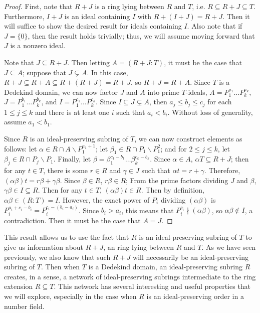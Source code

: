 \documentclass[12pt]{amsart}
\theoremstyle{definition}
\begin{document}
	\begin{proof}
		First, note that $R+J$ is a ring lying between $R$ and $T$, i.e. $R\subseteq R+J\subseteq T$. Furthermore, $I+J$ is an ideal containing $I$ with $R+(I+J)=R+J$. Then it will suffice to show the desired result for ideals containing $I$. Also note that if $J=\{0\}$, then the result holds trivially; thus, we will assume moving forward that $J$ is a nonzero ideal.
		
		Note that $J\subseteq R+J$. Then letting $A=(R+J:T)$, it must be the case that $J\subseteq A$; suppose that $J\subsetneq A$. In this case, $R+J\subseteq R+A\subseteq R+(R+J)=R+J$, so $R+J=R+A$. Since $T$ is a Dedekind domain, we can now factor $J$ and $A$ into prime $T$-ideals, $A=P_1^{a_1}\dots P_k^{a_k}$, $J=P_1^{b_1}\dots P_k^{b_k}$, and $I=P_1^{c_1}\dots P_k^{c_k}$. Since $I\subseteq J\subsetneq A$, then $a_j\leq b_j\leq c_j$ for each $1\leq j\leq k$ and there is at least one $i$ such that $a_i<b_i$. Without loss of generality, assume $a_1<b_1$.
		
		Since $R$ is an ideal-preserving subring of $T$, we can now construct elements as follows: let $\alpha\in R\cap A\backslash P_1^{a_1+1}$; let $\beta_1\in R\cap P_1 \backslash P_1^2$; and for $2\leq j\leq k$, let $\beta_j\in R\cap P_j\backslash P_1$. Finally, let $\beta=\beta_1^{c_1-b_1}\dots\beta_k^{c_k-b_k}$. Since $\alpha\in A$, $\alpha T\subseteq R+J$; then for any $t\in T$, there is some $r\in R$ and $\gamma\in J$ such that $\alpha t=r+\gamma$. Therefore, $(\alpha\beta)t=r\beta+\gamma\beta$. Since $\beta\in R$, $r\beta\in R$; From the prime factors dividing $J$ and $\beta$, $\gamma\beta\in I\subseteq R$. Then for any $t\in T$, $(\alpha\beta)t\in R$. Then by definition, $\alpha\beta\in (R:T)=I$. However, the exact power of $P_i$ dividing $(\alpha\beta)$ is $P_i^{a_i+c_i-b_i}=P_i^{c_i-(b_i-a_i)}$. Since $b_i>a_i$, this means that $P_i^{c_i}\nmid (\alpha\beta)$, so $\alpha\beta\notin I$, a contradiction. Then it must be the case that $A=J$.
	\end{proof}
	
	This result allows us to use the fact that $R$ is an ideal-preserving subring of $T$ to give us information about $R+J$, an ring lying between $R$ and $T$. As we have seen previously, we also know that such $R+J$ will necessarily be an ideal-preserving subring of $T$. Then when $T$ is a Dedekind domain, an ideal-preserving subring $R$ creates, in a sense, a network of ideal-preserving subrings intermediate to the ring extension $R\subseteq T$. This network has several interesting and useful properties that we will explore, especially in the case when $R$ is an ideal-preserving order in a number field.
	
\end{document}
